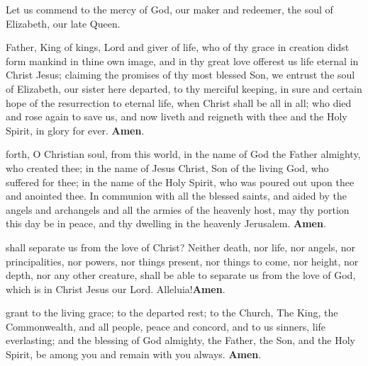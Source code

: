 



Let us commend to the mercy of God, our maker and redeemer, the soul of Elizabeth, our late Queen.

 Father, King of kings, Lord and giver of life, who of thy grace in
creation didst form mankind in thine own image, and in thy great love offerest
us life eternal in Christ Jesus; claiming the promises of thy most blessed Son, we entrust
the soul of Elizabeth, our sister here departed, to thy merciful keeping, in sure and
certain hope of the resurrection to eternal life, when Christ shall be all in all; who died
and rose again to save us, and now liveth and reigneth with thee and the Holy Spirit, in
glory for ever. \textbf{Amen}.

 forth, O Christian soul, from this world, in the name of God the Father
almighty, who created thee; in the name of Jesus Christ, Son of the living God,
who suffered for thee; in the name of the Holy Spirit, who was poured out upon thee
and anointed thee. In communion with all the blessed saints, and aided by the angels
and archangels and all the armies of the heavenly host, may thy portion this day be in
peace, and thy dwelling in the heavenly Jerusalem. \textbf{Amen}.



 shall separate us from the love of Christ? Neither death, nor life, nor
angels, nor principalities, nor powers, nor things present, nor things to come,
nor height, nor depth, nor any other creature, shall be able to separate us from the love
of God, which is in Christ Jesus our Lord. Alleluia!\textbf{Amen}.





 grant to the living grace; to the departed rest; to the Church, The King, the
Commonwealth, and all people, peace and concord, and to us sinners, life
everlasting; and the blessing of God almighty, the Father, the Son, and the Holy Spirit,
be among you and remain with you always. \textbf{Amen}.


